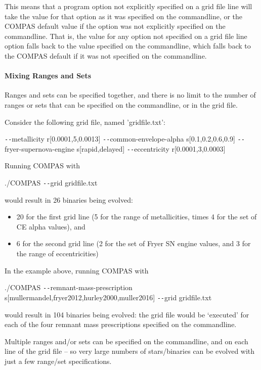 This means that a program option not explicitly specified on a grid file line will take the value for that option as it was specified on the commandline, or the COMPAS default value if the option was not explicitly specified on the commandline. That is, the value for any option not specified on a grid file line option falls back to the value specified on the commandline, which falls back to the COMPAS default if it was not specified on the commandline.

\paragraph{Mixing Ranges and Sets}\label{sec:MixingRangesAndSets}\mbox{}

Ranges and sets can be specified together, and there is no limit to the number of ranges or sets that can be specified on the commandline, or in the grid file.

\bigskip
Consider the following grid file, named 'gridfile.txt':

\tabto{3em}\texttt{-{}-}metallicity r[0.0001,5,0.0013] \texttt{-{}-}common-envelope-alpha s[0.1,0.2,0.6,0.9]
\tabto{3em}\texttt{-{}-}fryer-supernova-engine s[rapid,delayed] \texttt{-{}-}eccentricity r[0.0001,3,0.0003]

\bigskip
Running COMPAS with

\tabto{3em}./COMPAS \texttt{-{}-}grid gridfile.txt

\bigskip
would result in 26 binaries being evolved:
\begin{itemize}
\item 20 for the first grid line (5 for the range of metallicities, times 4 for the set of CE alpha values), and
\item 6 for the second grid line (2 for the set of Fryer SN engine values, and 3 for the range of eccentricities)
\end{itemize}

\bigskip
In the example above, running COMPAS with

\small
\tabto{2.5em}./COMPAS \texttt{-{}-}remnant-mass-prescription s[mullermandel,fryer2012,hurley2000,muller2016] \texttt{-{}-}grid gridfile.txt
\normalsize

\bigskip
would result in 104 binaries being evolved: the grid file would be ‘executed’ for each of the four remnant mass prescriptions specified on the commandline.

Multiple ranges and/or sets can be specified on the commandline, and on each line of the grid file – so very large numbers of stars/binaries can be evolved with just a few range/set specifications.

